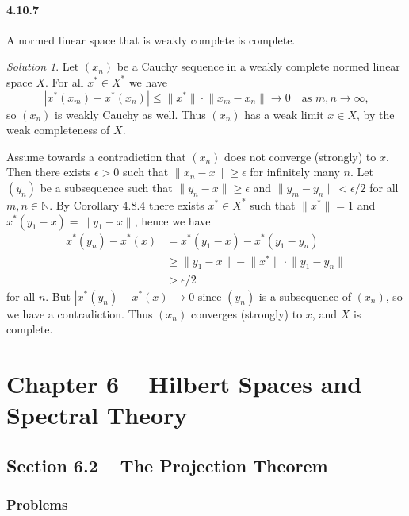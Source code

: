 \documentclass{report}
\newcommand{\bb}[1]{\mathbb{#1}}
\newcommand{\norm}[1]{{\lVert #1 \rVert}}
\theoremstyle{remark}
\newtheorem*{solution}{Solution}
\begin{document}
\subsubsection*{4.10.7}
A normed linear space that is weakly complete is complete.

\begin{solution}
  Let $(x_n)$ be a Cauchy sequence in a weakly complete normed linear space $X$. For all $x^* \in X^*$ we have
  \begin{equation*}
    |x^*(x_m) - x^*(x_n)| \le \norm{x^*} \cdot \norm{x_m - x_n} \to 0 \quad \text{as $m,n \to \infty$,}
  \end{equation*}
  so $(x_n)$ is weakly Cauchy as well. Thus $(x_n)$ has a weak limit $x \in X$, by the weak completeness of $X$.

  Assume towards a contradiction that $(x_n)$ does not converge (strongly) to $x$. Then there exists $\epsilon > 0$ such that $\norm{x_n - x} \ge \epsilon$ for infinitely many $n$. Let $(y_n)$ be a subsequence such that $\norm{y_n - x} \ge \epsilon$ and $\norm{y_m - y_n} < \epsilon/2$ for all $m,n \in \bb N$. By Corollary 4.8.4 there exists $x^* \in X^*$ such that $\norm{x^*} = 1$ and $x^*(y_1 - x) = \norm{y_1 - x}$, hence we have
  \begin{equation*}
    \begin{split}
      x^*(y_n) - x^*(x) &= x^*(y_1 - x) - x^*(y_1 - y_n) \\
      &\ge \norm{y_1 - x} - \norm{x^*} \cdot \norm{y_1 - y_n} \\
      &> \epsilon/2
    \end{split}
  \end{equation*}
  for all $n$. But $|x^*(y_n) - x^*(x)| \to 0$ since $(y_n)$ is a subsequence of $(x_n)$, so we have a contradiction. Thus $(x_n)$ converges (strongly) to $x$, and $X$ is complete.
\end{solution}

\chapter*{Chapter 6 -- Hilbert Spaces and Spectral Theory}

\section*{Section 6.2 -- The Projection Theorem}

\subsection*{Problems}
\end{document}
